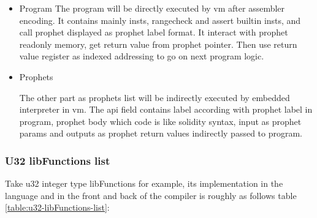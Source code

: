 \begin{itemize}
    \item Program
The program will be directly executed by vm after assembler encoding. It contains mainly insts, rangecheck and assert builtin insts,
and call prophet displayed as prophet label format. It interact with prophet readonly memory, get return value from prophet pointer.
Then use return value register as indexed addressing to go on next program logic.
    \item Prophets

The other part as prophets list will be indirectly executed by embedded interpreter in vm.
The api field contains label according with prophet label in program, prophet body which code is like solidity syntax,
input as prophet params and outputs as prophet return values indirectly passed to program.
\end{itemize}

\subsubsection{U32 libFunctions list}
    Take u32 integer type libFunctions for example, its implementation in the language and in the front and back of the compiler is roughly as follows table \ref{table:u32-libFunctions-list}:

